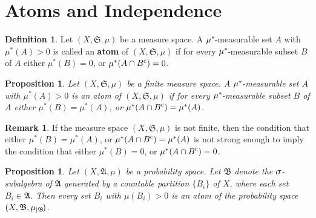 \documentclass[
twoside=true,
paper=letter,
fontsize=9pt,
pagesize=auto,
leqno,
openany,
headsepline,
overfullrule,
]{scrbook}
\theoremstyle{plain}
\theoremstyle{plain}
\newtheorem{prop}[thm]{Proposition}
\theoremstyle{definition}
\newtheorem{defn}[thm]{Definition}
\newtheorem{rmk}[thm]{Remark}
\theoremstyle{bfnoteitalic}
\theoremstyle{bfnoteroman}
\newcommand{\term}[1]{\textbf{#1}\index{#1}}
\newcommand{\sigalg}[1]{\mathfrak{#1}}
\newcommand{\textsigma}{\hbox{\large{$\sigma$}}\kern-1pt}
\newcommand{\restrictedto}[1]{_{\lvert#1}\kern-1.5pt}
\newcommand{\comp}{^{\hbox{\tiny{$\mathsf C$}}}}
\newcommand{\meets}{\cap}
\newcommand{\semiring}{\sigalg{S}}
\newcommand{\sigmaalgebra}{\sigalg{A}}
\newcommand{\sigmaalgebraii}{\sigalg{B}}
\newcommand{\kernast}{\ast\kern-1pt}
\newcommand{\sigalgb}{\sigmaalgebraii}
\newcommand{\measurespace}{X}
\newcommand{\measure}{\mu}
\begin{document}
\section{Atoms and Independence}
%




\begin{defn}
Let $(\measurespace, \semiring, \measure)$ be a measure space.  A $\measure^\kernast$-measurable set $A$ with $\measure^*(A)>0$ is called an \term{atom} of $(\measurespace, \semiring, \measure)$ if for every $\measure^\kernast$-measurable subset $B$ of $A$ either $\measure^*(B) = 0$, or $\measure^*(A\meets B\comp)=0$. 
\end{defn}



\begin{prop}\label{atom}
Let $(\measurespace, \semiring, \measure)$ be a finite measure space.  A
$\measure^\kernast$\hyp{}measurable set $A$ with $\measure^*(A)>0$ is an atom of $(\measurespace, \semiring, \measure)$ if for every $\measure^\kernast$-measurable subset $B$ of $A$ either $\measure^*(B) = \measure^*(A)$, or $\measure^*(A\meets B\comp)= \measure^*(A)$.
\end{prop}



\begin{rmk}
If the measure space $(\measurespace, \semiring, \measure)$ is not finite, then the condition that either $\measure^*(B) = \measure^*(A)$, or $\measure^*(A\meets B\comp)= \measure^*(A)$
is not strong enough to imply the condition that
either $\measure^*(B) = 0$, or $\measure^*(A\meets B\comp)=0$. 
\end{rmk}



\begin{prop}\label{countable_partition_of_atoms}
Let $(\measurespace, \sigmaalgebra,\measure)$ be a probability space.
Let $\sigalgb$ denote the $\textsigma$-subalgebra of $\sigmaalgebra$ generated by a countable partition $\{B_i\}$ of $\measurespace$, where each set $B_i\in\sigmaalgebra$. Then every set $B_i$ with 
$\measure(B_i) > 0$ is an atom of the probability space
$(\measurespace, \sigalgb,\measure\restrictedto{\sigalgb})$.
\end{prop}
\end{document}
